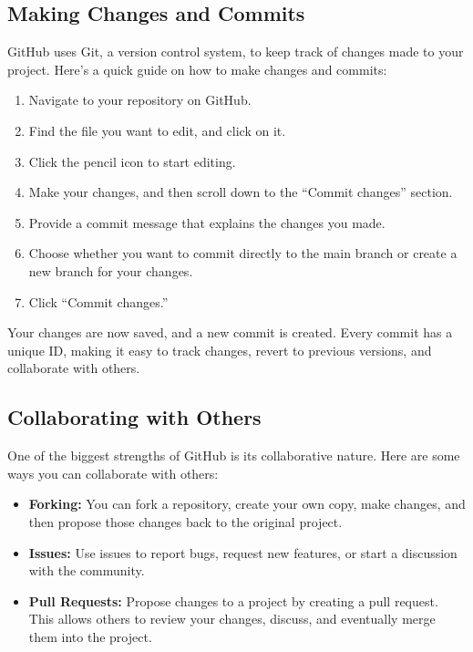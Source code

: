 \documentclass[a4paper,12pt]{book}
\begin{document}
\subsection*{Making Changes and Commits}

GitHub uses Git, a version control system, to keep track of changes made to your project. Here’s a quick guide on how to make changes and commits:

\begin{enumerate}
    \item Navigate to your repository on GitHub.
    \item Find the file you want to edit, and click on it.
    \item Click the pencil icon to start editing.
    \item Make your changes, and then scroll down to the “Commit changes” section.
    \item Provide a commit message that explains the changes you made.
    \item Choose whether you want to commit directly to the main branch or create a new branch for your changes.
    \item Click “Commit changes.”
\end{enumerate}

Your changes are now saved, and a new commit is created. Every commit has a unique ID, making it easy to track changes, revert to previous versions, and collaborate with others.

\subsection*{Collaborating with Others}

One of the biggest strengths of GitHub is its collaborative nature. Here are some ways you can collaborate with others:

\begin{itemize}
    \item \textbf{Forking:} You can fork a repository, create your own copy, make changes, and then propose those changes back to the original project.
    \item \textbf{Issues:} Use issues to report bugs, request new features, or start a discussion with the community.
    \item \textbf{Pull Requests:} Propose changes to a project by creating a pull request. This allows others to review your changes, discuss, and eventually merge them into the project.
\end{itemize}
\end{document}
